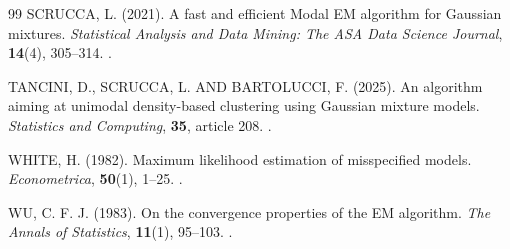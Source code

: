 \begin{thebibliography}{99}
\MakeUppercase{Scrucca, L.} (2021).
A fast and efficient Modal EM algorithm for Gaussian mixtures.
\emph{Statistical Analysis and Data Mining: The ASA Data Science Journal},
\textbf{14}(4), 305--314.
.

\MakeUppercase{Tancini, D., Scrucca, L. and Bartolucci, F.} (2025).
An algorithm aiming at unimodal density-based clustering using Gaussian mixture models.
\emph{Statistics and Computing}, \textbf{35}, article 208.
.

\MakeUppercase{White, H.} (1982).
Maximum likelihood estimation of misspecified models.
\emph{Econometrica}, \textbf{50}(1), 1--25.
.

\MakeUppercase{Wu, C. F. J.} (1983).
On the convergence properties of the EM algorithm.
\emph{The Annals of Statistics}, \textbf{11}(1), 95--103.
.

\end{thebibliography}
